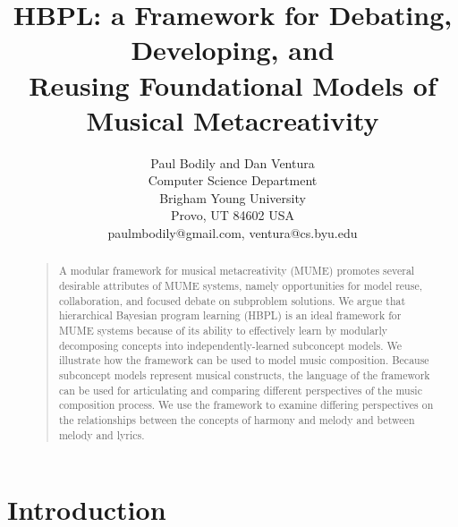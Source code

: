\documentclass[letterpaper]{article}
\begin{document}

\title{HBPL: a Framework for Debating, Developing, and\\Reusing Foundational Models of Musical Metacreativity}
\author{Paul Bodily and Dan Ventura\\
Computer Science Department\\
Brigham Young University\\
Provo, UT 84602  USA\\
paulmbodily@gmail.com, ventura@cs.byu.edu\\
}
\maketitle
\begin{abstract}
\begin{quote}
A modular framework for musical metacreativity (MUME) promotes several desirable attributes of MUME systems, namely opportunities for model reuse, collaboration, and focused debate on subproblem solutions. We argue that hierarchical Bayesian program learning (HBPL) is an ideal framework for MUME systems because of its ability to effectively learn by modularly decomposing concepts into independently-learned subconcept models. We illustrate how the framework can be used to model music composition. Because subconcept models represent musical constructs, the language of the framework can be used for articulating and comparing different perspectives of the music composition process. We use the framework to examine differing perspectives on the relationships between the concepts of harmony and melody and between melody and lyrics.
\end{quote}
\end{abstract}

\section{Introduction}
\end{document}
